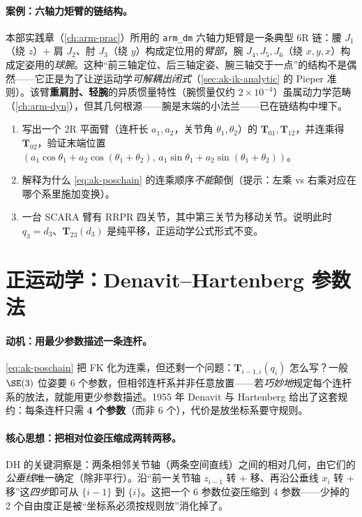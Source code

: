 \paragraph{案例：六轴力矩臂的链结构。}
本部实践章（\cref{ch:arm-prac}）所用的 \texttt{arm\_dm} 六轴力矩臂是一条典型 6R 链：腰 $J_1$（绕 $z$）+ 肩 $J_2$、肘 $J_3$（绕 $y$）构成定位用的\emph{臂部}，腕 $J_4,J_5,J_6$（绕 $x,y,x$）构成定姿用的\emph{球腕}。这种“前三轴定位、后三轴定姿、腕三轴交于一点”的结构不是偶然——它正是为了让逆运动学\emph{可解耦出闭式}（\cref{sec:ak-ik-analytic} 的 Pieper 准则）。该臂\textbf{重肩肘、轻腕}的异质惯量特性（腕惯量仅约 $2\times10^{-4}$）虽属动力学范畴（\cref{ch:arm-dyn}），但其几何根源——腕是末端的小法兰——已在链结构中埋下。

\begin{practice}
\begin{enumerate}
  \item 写出一个 2R 平面臂（连杆长 $a_1,a_2$，关节角 $\theta_1,\theta_2$）的 $\mathbf{T}_{01},\mathbf{T}_{12}$，并连乘得 $\mathbf{T}_{02}$，验证末端位置 $(a_1\cos\theta_1+a_2\cos(\theta_1+\theta_2),\,a_1\sin\theta_1+a_2\sin(\theta_1+\theta_2))$。
  \item 解释为什么 \cref{eq:ak-poschain} 的连乘顺序\emph{不能}颠倒（提示：左乘 vs 右乘对应在哪个系里施加变换）。
  \item 一台 SCARA 臂有 RRPR 四关节，其中第三关节为移动关节。说明此时 $q_3=d_3$、$\mathbf{T}_{23}(d_3)$ 是纯平移，正运动学公式形式不变。
\end{enumerate}
\end{practice}

\section{正运动学：Denavit--Hartenberg 参数法}
\label{sec:ak-dh}

\paragraph{动机：用最少参数描述一条连杆。}
\cref{eq:ak-poschain} 把 FK 化为连乘，但还剩一个问题：$\mathbf{T}_{i-1,i}(q_i)$ 怎么写？一般 $\SE(3)$ 位姿要 6 个参数，但相邻连杆系并非任意放置——若\emph{巧妙地}规定每个连杆系的放法，就能用更少参数描述。1955 年 Denavit 与 Hartenberg 给出了这套规约\cite{spong2006robot}：每条连杆只需 \textbf{4 个参数}（而非 6 个），代价是放坐标系要守规则。

\paragraph{核心思想：把相对位姿压缩成两转两移。}
DH 的关键洞察是：两条相邻关节轴（两条空间直线）之间的相对几何，由它们的\emph{公垂线}唯一确定（除非平行）。沿“前一关节轴 $z_{i-1}$ 转 + 移、再沿公垂线 $x_i$ 转 + 移”这\emph{四步}即可从 $\{i-1\}$ 到 $\{i\}$。这把一个 6 参数位姿压缩到 4 参数——少掉的 2 个自由度正是被“坐标系必须按规则放”消化掉了。

